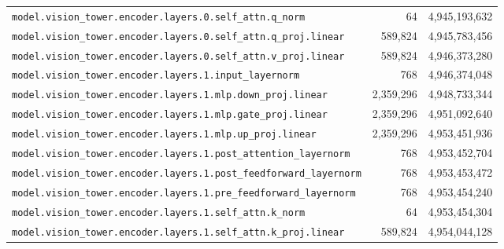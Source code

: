 \documentclass[10pt,a4paper]{article}
\theoremstyle{definition}
\begin{document}
\begin{appendices}
\begin{longtable}{p{9.5cm}rr}
\texttt{model.\allowbreak{}vision\_tower.\allowbreak{}encoder.\allowbreak{}layers.\allowbreak{}0.\allowbreak{}self\_attn.\allowbreak{}q\_norm} & 64 & 4,945,193,632 \\
\texttt{model.\allowbreak{}vision\_tower.\allowbreak{}encoder.\allowbreak{}layers.\allowbreak{}0.\allowbreak{}self\_attn.\allowbreak{}q\_proj.\allowbreak{}linear} & 589,824 & 4,945,783,456 \\
\texttt{model.\allowbreak{}vision\_tower.\allowbreak{}encoder.\allowbreak{}layers.\allowbreak{}0.\allowbreak{}self\_attn.\allowbreak{}v\_proj.\allowbreak{}linear} & 589,824 & 4,946,373,280 \\
\texttt{model.\allowbreak{}vision\_tower.\allowbreak{}encoder.\allowbreak{}layers.\allowbreak{}1.\allowbreak{}input\_layernorm} & 768 & 4,946,374,048 \\
\texttt{model.\allowbreak{}vision\_tower.\allowbreak{}encoder.\allowbreak{}layers.\allowbreak{}1.\allowbreak{}mlp.\allowbreak{}down\_proj.\allowbreak{}linear} & 2,359,296 & 4,948,733,344 \\
\texttt{model.\allowbreak{}vision\_tower.\allowbreak{}encoder.\allowbreak{}layers.\allowbreak{}1.\allowbreak{}mlp.\allowbreak{}gate\_proj.\allowbreak{}linear} & 2,359,296 & 4,951,092,640 \\
\texttt{model.\allowbreak{}vision\_tower.\allowbreak{}encoder.\allowbreak{}layers.\allowbreak{}1.\allowbreak{}mlp.\allowbreak{}up\_proj.\allowbreak{}linear} & 2,359,296 & 4,953,451,936 \\
\texttt{model.\allowbreak{}vision\_tower.\allowbreak{}encoder.\allowbreak{}layers.\allowbreak{}1.\allowbreak{}post\_attention\_layernorm} & 768 & 4,953,452,704 \\
\texttt{model.\allowbreak{}vision\_tower.\allowbreak{}encoder.\allowbreak{}layers.\allowbreak{}1.\allowbreak{}post\_feedforward\_layernorm} & 768 & 4,953,453,472 \\
\texttt{model.\allowbreak{}vision\_tower.\allowbreak{}encoder.\allowbreak{}layers.\allowbreak{}1.\allowbreak{}pre\_feedforward\_layernorm} & 768 & 4,953,454,240 \\
\texttt{model.\allowbreak{}vision\_tower.\allowbreak{}encoder.\allowbreak{}layers.\allowbreak{}1.\allowbreak{}self\_attn.\allowbreak{}k\_norm} & 64 & 4,953,454,304 \\
\texttt{model.\allowbreak{}vision\_tower.\allowbreak{}encoder.\allowbreak{}layers.\allowbreak{}1.\allowbreak{}self\_attn.\allowbreak{}k\_proj.\allowbreak{}linear} & 589,824 & 4,954,044,128 \\

\end{longtable}
\end{appendices}
\end{document}

